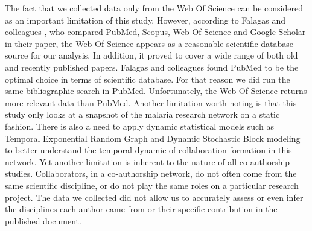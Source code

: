 The fact that we collected data only from the Web Of Science can be considered as an important limitation of this study. However, according to Falagas and colleagues \cite{falagas_comparison_2007}, who compared PubMed, Scopus, Web Of Science and Google Scholar in their paper, the Web Of Science appears as a reasonable scientific database source for our analysis. In addition, it proved to cover a wide range of both old and recently published papers. Falagas and colleagues \cite{falagas_comparison_2007} found PubMed to be the optimal choice in terms of scientific database. For that reason we did run the same bibliographic search in PubMed. Unfortunately, the Web Of Science returns more relevant data than PubMed. Another limitation worth noting is that this study only looks at a snapshot of the malaria research network on a static fashion. There is also a need to apply dynamic statistical models such as Temporal Exponential Random Graph \cite{leifeld_temporal_2015} and Dynamic Stochastic Block \cite{matias_statistical_2016} modeling to better understand the temporal dynamic of collaboration formation in this network. Yet another limitation is inherent to the nature of all co-authorship studies. Collaborators, in a co-authorship network, do not often come from the same scientific discipline, or do not play the same roles on a particular research project. The data we collected did not allow us to accurately assess or even infer the disciplines each author came from or their specific contribution in the published document.
